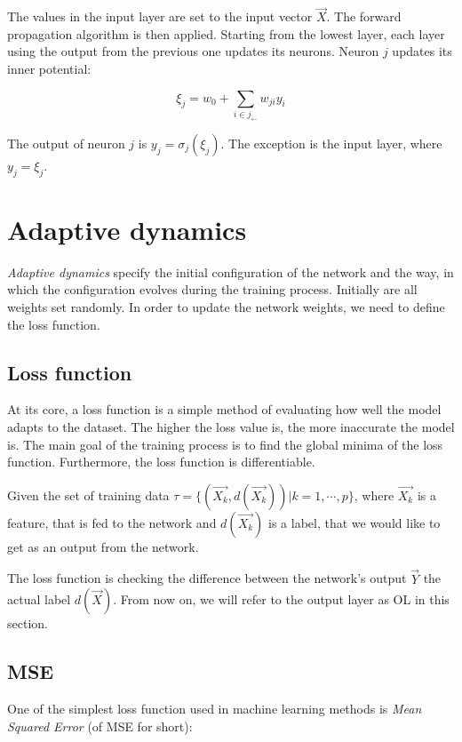 The values in the input layer are set to the input vector $\overrightarrow{X}$. The forward propagation algorithm is then applied. Starting from the lowest layer, each layer using the output from the previous one updates its neurons. Neuron $j$ updates its inner potential:

$$ \xi_j = w_0 + \sum_{i \in j_{\leftarrow}} w_{ji} y_i $$

The output of neuron $j$ is $y_j = \sigma_j (\xi_j)$. The exception is the input layer, where $y_j = \xi_j$.

\section{Adaptive dynamics}

\textit{Adaptive dynamics} specify the initial configuration of the network and the way, in which the configuration evolves during the training process. Initially are all weights set randomly. In order to update the network weights, we need to define the loss function.

\subsection{Loss function}

At its core, a loss function \cite{loss} is a simple method of evaluating how well the model adapts to the dataset. The higher the loss value is, the more inaccurate the model is. The main goal of the training process is to find the global minima of the loss function. Furthermore, the loss function is differentiable.

Given the set of training data $\tau = \lbrace (\overrightarrow{X_k}, d(\overrightarrow{X_k})) \vert k = 1, \cdots, p \rbrace$, where $\overrightarrow{X_k}$ is a feature, that is fed to the network and $d(\overrightarrow{X_k})$ is a label, that we would like to get as an output from the network.

The loss function is checking the difference between the network's output $\overrightarrow{Y}$ the actual label $d(\overrightarrow{X})$. From now on, we will refer to the output layer as OL in this section.

\subsection*{MSE}

One of the simplest loss function used in machine learning methods is \textit{Mean Squared Error} (of MSE for short):

